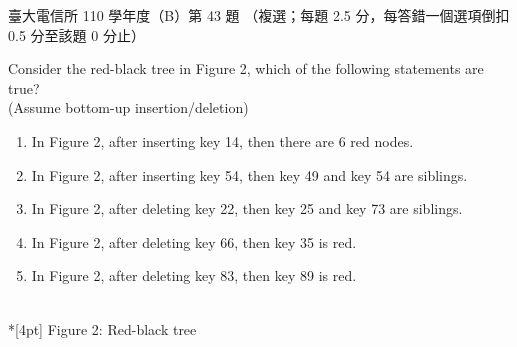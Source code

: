\begin{pastexam}[label={px:ntu-110-comm-dsa-43}]{臺大電信所 110 學年度（B）第 43 題}
（複選；每題 2.5 分，每答錯一個選項倒扣 0.5 分至該題 0 分止）

Consider the red-black tree in Figure 2, which of the following statements are true?\\
(Assume bottom-up insertion/deletion)
\begin{enumerate}[label=\Alph*.]
\item In Figure 2, after inserting key 14, then there are 6 red nodes.
\item In Figure 2, after inserting key 54, then key 49 and key 54 are siblings.
\item In Figure 2, after deleting key 22, then key 25 and key 73 are siblings.
\item In Figure 2, after deleting key 66, then key 35 is red.
\item In Figure 2, after deleting key 83, then key 89 is red.
\end{enumerate}
\begin{center}
\\*[4pt] Figure 2: Red-black tree
\end{center}
\end{pastexam}

